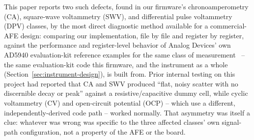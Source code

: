 This paper reports two such defects, found in our firmware's
chronoamperometry (CA), square-wave voltammetry (SWV), and differential
pulse voltammetry (DPV) classes, by the most direct diagnostic method
available for a commercial-AFE design: comparing our implementation, file
by file and register by register, against the performance and
register-level behavior of Analog Devices' own AD5940 evaluation-kit
reference examples for the same class of
measurement~\cite{ad5940_examples_github} -- the same evaluation-kit code
this firmware, and the instrument as a whole
(Section~\ref{sec:instrument-design}), is built from. Prior internal testing on this
project had reported that CA and SWV produced ``flat, noisy scatter with no
discernible decay or peak'' against a resistive/capacitive dummy cell, while
cyclic voltammetry (CV) and open-circuit potential (OCP) -- which use a
different, independently-derived code path -- worked normally. That
asymmetry was itself a clue: whatever was wrong was specific to the three
affected classes' own signal-path configuration, not a property of the AFE
or the board.

